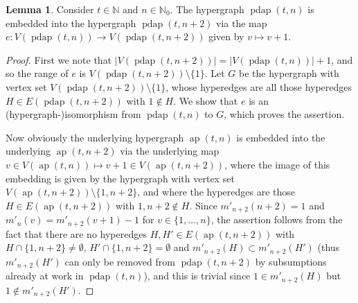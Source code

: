 \documentclass[final,3p,times]{elsarticle}
\theoremstyle{definition}
\newtheorem{lem}{Lemma}[section]
\newcommand{\set}[1]{\{#1\}}
\newcommand{\NN}{\mathbb{N}}
\newcommand{\NNZ}{\NN_0}
\providecommand{\abs}[1]{\lvert #1 \rvert}
\DeclareMathOperator{\arithp}{ap}
\DeclareMathOperator{\pdarithp}{pdap}
\begin{document}
\begin{lem}\label{lem:embpd}
  Consider $t \in \NN$ and $n \in \NNZ$. The hypergraph $\pdarithp(t,n)$ is embedded into the hypergraph $\pdarithp(t,n+2)$ via the map $e: V(\pdarithp(t,n)) \rightarrow V(\pdarithp(t,n+2))$ given by $v \mapsto v+1$.
\end{lem}
\begin{proof}
  First we note that $\abs{V(\pdarithp(t,n+2))} = \abs{V(\pdarithp(t,n))}+1$, and so the range of $e$ is $V(\pdarithp(t,n+2)) \setminus \set{1}$. Let $G$ be the hypergraph with vertex set $V(\pdarithp(t,n+2)) \setminus \set{1}$, whose hyperedges are all those hyperedges $H \in E(\pdarithp(t,n+2))$ with $1 \notin H$.  We show that $e$ is an (hypergraph-)isomorphism from $\pdarithp(t,n)$ to $G$, which proves the assertion.

  Now obviously the underlying hypergraph $\arithp(t,n)$ is embedded into the underlying $\arithp(t,n+2)$ via the underlying map $v \in V(\arithp(t,n)) \mapsto v+1 \in V(\arithp(t,n+2))$, where the image of this embedding is given by the hypergraph with vertex set $V(\arithp(t,n+2)) \setminus \set{1,n+2}$, and where the hyperedges are those $H \in E(\arithp(t,n+2))$ with $1, n+2 \notin H$. Since $m'_{n+2}(n+2) = 1$ and $m'_n(v) = m'_{n+2}(v+1)-1$ for $v \in \set{1,\dots,n}$, the assertion follows from the fact that there are no hyperedges $H, H' \in E(\arithp(t,n+2))$ with $H \cap \set{1,n+2} \not= \emptyset$, $H' \cap \set{1,n+2} = \emptyset$ and $m'_{n+2}(H) \subset m'_{n+2}(H')$ (thus $m'_{n+2}(H')$ can only be removed from $\pdarithp(t,n+2)$ by subsumptions already at work in $\pdarithp(t,n)$), and this is trivial since $1 \in m'_{n+2}(H)$ but $1 \notin m'_{n+2}(H')$.
\end{proof}
\end{document}
